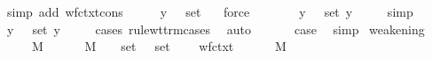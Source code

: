 \begin{isabellebody}
\ {\isacharparenleft}simp\ add{\isacharcolon}\ wf{\isacharunderscore}ctxt{\isacharunderscore}cons{\isacharparenright}\isanewline
\ \ \isamarkupfalse%
\ \isamarkupfalse%
\ {\isachardoublequoteopen}{\isacharparenleft}y{\isacharcomma}\ {\isasymsigma}{\isacharparenright}\ {\isasymnotin}\ set\ {\isasymGamma}{\isachardoublequoteclose}\ \isamarkupfalse%
\ force\isanewline
\ \ \isamarkupfalse%
\ {}{\isacharparenleft}{}{\isacharparenright}\ \isamarkupfalse%
\ {}{\isacharcolon}\ {\isachardoublequoteopen}{\isacharparenleft}y{\isacharcomma}\ {\isasymsigma}{\isacharparenright}\ {\isasymnotin}\ set\ {\isacharparenleft}{\isacharparenleft}y{\isacharcomma}\ {\isasymtau}{\isacharparenright}\ {\isacharhash}\ {\isasymGamma}{\isacharparenright}{\isachardoublequoteclose}\ \isamarkupfalse%
\ simp\isanewline
\ \ \isamarkupfalse%
\ {}{\isacharparenleft}{}{\isacharparenright}\ \isamarkupfalse%
\ {\isachardoublequoteopen}{\isacharparenleft}y{\isacharcomma}\ {\isasymsigma}{\isacharparenright}\ {\isasymin}\ set\ {\isacharparenleft}{\isacharparenleft}y{\isacharcomma}\ {\isasymtau}{\isacharparenright}\ {\isacharhash}\ {\isasymGamma}{\isacharparenright}{\isachardoublequoteclose}\ \isamarkupfalse%
\ {\isacharparenleft}cases\ rule{\isacharcolon}wt{\isacharunderscore}trm{\isachardot}cases{\isacharparenright}\ \isamarkupfalse%
\ auto\isanewline
\ \ \isamarkupfalse%
\ {}\ \isamarkupfalse%
\ {\isacharquery}case\ \isamarkupfalse%
\ simp\isanewline
{}\isamarkupfalse%
%
\endisatagproof
{\isafoldproof}%
%
\isadelimproof
\isanewline
%
\endisadelimproof
\isanewline
{}\isamarkupfalse%
\ weakening{\isacharcolon}\isanewline
\ \ \ {\isasymGamma}\ {\isasymGamma}{\isacharprime}\ M\ {\isasymsigma}\isanewline
\ \ \ {\isachardoublequoteopen}{\isasymGamma}\ {\isasymturnstile}\ M\ {\isacharcolon}\ {\isasymsigma}{\isachardoublequoteclose}\ \ {\isachardoublequoteopen}set\ {\isasymGamma}\ {\isasymsubseteq}\ set\ {\isasymGamma}{\isacharprime}{\isachardoublequoteclose}\isanewline
\ \ \ {\isachardoublequoteopen}wf{\isacharunderscore}ctxt\ {\isasymGamma}{\isacharprime}{\isachardoublequoteclose}\isanewline
\ \ \ {\isachardoublequoteopen}{\isasymGamma}{\isacharprime}\ {\isasymturnstile}\ M\ {\isacharcolon}\ {\isasymsigma}{\isachardoublequoteclose}\isanewline

\end{isabellebody}
